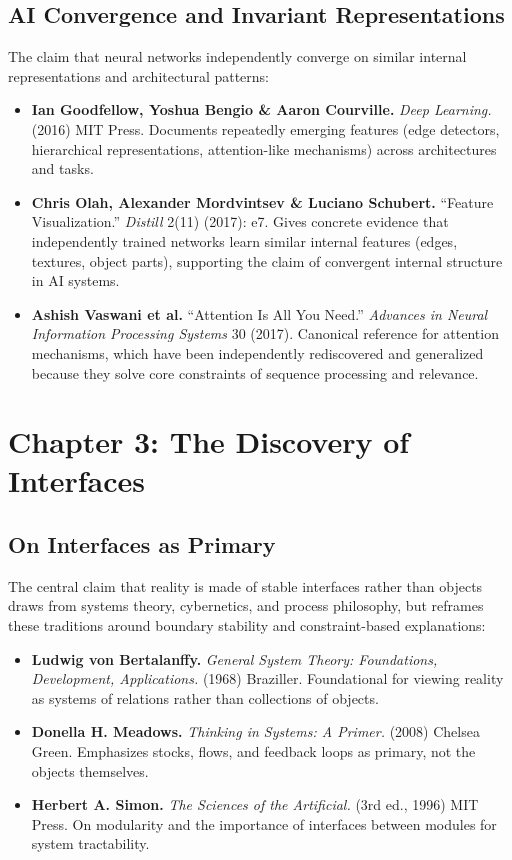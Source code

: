 \documentclass[
  openright]{book}
\begin{document}
\subsection{AI Convergence and Invariant
Representations}\label{ai-convergence-and-invariant-representations}

The claim that neural networks independently converge on similar
internal representations and architectural patterns:

\begin{itemize}
\item
  \textbf{Ian Goodfellow, Yoshua Bengio \& Aaron Courville.} \emph{Deep
  Learning.} (2016) MIT Press. Documents repeatedly emerging features
  (edge detectors, hierarchical representations, attention-like
  mechanisms) across architectures and tasks.
\item
  \textbf{Chris Olah, Alexander Mordvintsev \& Luciano Schubert.}
  ``Feature Visualization.'' \emph{Distill} 2(11) (2017): e7. Gives
  concrete evidence that independently trained networks learn similar
  internal features (edges, textures, object parts), supporting the
  claim of convergent internal structure in AI systems.
\item
  \textbf{Ashish Vaswani et al.} ``Attention Is All You Need.''
  \emph{Advances in Neural Information Processing Systems} 30 (2017).
  Canonical reference for attention mechanisms, which have been
  independently rediscovered and generalized because they solve core
  constraints of sequence processing and relevance.
\end{itemize}

\section{Chapter 3: The Discovery of
Interfaces}\label{chapter-3-the-discovery-of-interfaces}

\subsection{On Interfaces as Primary}\label{on-interfaces-as-primary}

The central claim that reality is made of stable interfaces rather than
objects draws from systems theory, cybernetics, and process philosophy,
but reframes these traditions around boundary stability and
constraint-based explanations:

\begin{itemize}
\item
  \textbf{Ludwig von Bertalanffy.} \emph{General System Theory:
  Foundations, Development, Applications.} (1968) Braziller.
  Foundational for viewing reality as systems of relations rather than
  collections of objects.
\item
  \textbf{Donella H. Meadows.} \emph{Thinking in Systems: A Primer.}
  (2008) Chelsea Green. Emphasizes stocks, flows, and feedback loops as
  primary, not the objects themselves.
\item
  \textbf{Herbert A. Simon.} \emph{The Sciences of the Artificial.} (3rd
  ed., 1996) MIT Press. On modularity and the importance of interfaces
  between modules for system tractability.
\end{itemize}
\end{document}
